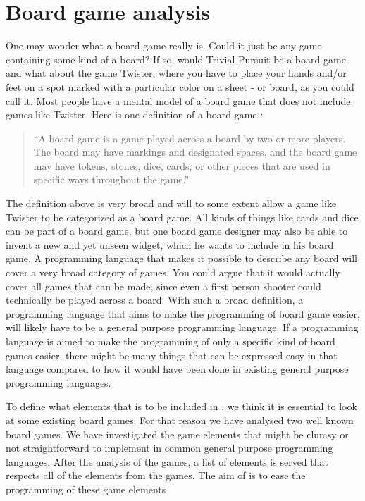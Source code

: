 \section{Board game analysis}
\label{sec:board-game-analysis}

One may wonder what a board game really is. Could it just be any game
containing some kind of a board? If so, would Trivial Pursuit be a board
game and what about the game Twister, where you have to place your hands
and/or feet on a spot marked with a particular color on a sheet - or
board, as you could call it. Most people have a mental model of a board
game that does not include games like Twister. Here is one definition of
a board game \cite{def-board-game}:

\begin{quote}
  ``A board game is a game played across a board by two or
  more players. The board may have markings and designated spaces, and the
  board game may have tokens, stones, dice, cards, or other pieces that
  are used in specific ways throughout the game.''
\end{quote}

The definition above is very broad and will to some extent allow a game
like Twister to be categorized as a board game. All kinds of things
like cards and dice can be part of a board game, but one board game
designer may also be able to invent a new and yet unseen widget, which
he wants to include in his board game. A programming language that makes
it possible to describe any board will cover a very broad category of
games. You could argue that it would actually cover all games that can
be made, since even a first person shooter could technically be played across a
board. With such a broad definition, a programming language that aims
to make the programming of board game easier, will likely have to be a general purpose programming language. If a programming
language is aimed to make the programming of only a specific kind of
board games easier, there might be many things that can be expressed easy in that language compared 
to how it would have been done in existing general purpose programming languages.

To define what elements that is to be included in \productname{}, we think it is essential to look at some existing board games. For that reason we have analysed two well known board games. We have investigated the game elements that might be clumsy or not straightforward to implement in common general purpose programming languages. After the analysis of the games, a list of elements is served that respects all of the elements from the games. The aim of \productname{} is to ease the programming of these game elements
